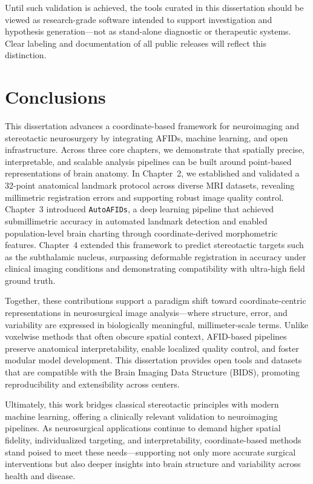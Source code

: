 Until such validation is achieved, the tools curated in this dissertation should be viewed as research-grade software intended to support investigation and hypothesis generation—not as stand-alone diagnostic or therapeutic systems. Clear labeling and documentation of all public releases will reflect this distinction.

\section{Conclusions}

This dissertation advances a coordinate-based framework for neuroimaging and stereotactic neurosurgery by integrating AFIDs, machine learning, and open infrastructure. Across three core chapters, we demonstrate that spatially precise, interpretable, and scalable analysis pipelines can be built around point-based representations of brain anatomy. In Chapter~2, we established and validated a 32-point anatomical landmark protocol across diverse MRI datasets, revealing millimetric registration errors and supporting robust image quality control. Chapter~3 introduced \texttt{AutoAFIDs}, a deep learning pipeline that achieved submillimetric accuracy in automated landmark detection and enabled population-level brain charting through coordinate-derived morphometric features. Chapter~4 extended this framework to predict stereotactic targets such as the subthalamic nucleus, surpassing deformable registration in accuracy under clinical imaging conditions and demonstrating compatibility with ultra-high field ground truth.

Together, these contributions support a paradigm shift toward coordinate-centric representations in neurosurgical image analysis—where structure, error, and variability are expressed in biologically meaningful, millimeter-scale terms. Unlike voxelwise methods that often obscure spatial context, AFID-based pipelines preserve anatomical interpretability, enable localized quality control, and foster modular model development. This dissertation provides open tools and datasets that are compatible with the Brain Imaging Data Structure (BIDS), promoting reproducibility and extensibility across centers.

Ultimately, this work bridges classical stereotactic principles with modern machine learning, offering a clinically relevant validation to neuroimaging pipelines. As neurosurgical applications continue to demand higher spatial fidelity, individualized targeting, and interpretability, coordinate-based methods stand poised to meet these needs—supporting not only more accurate surgical interventions but also deeper insights into brain structure and variability across health and disease.
